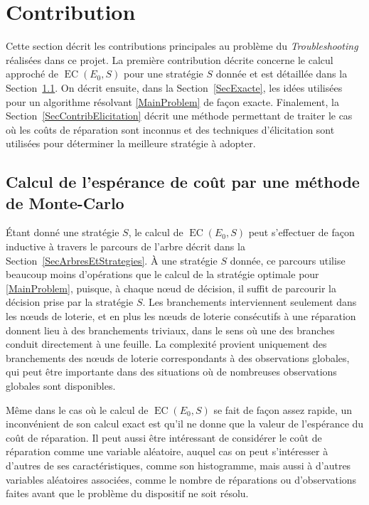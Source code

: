 \documentclass[a4paper,11pt]{article}
\theoremstyle{plain}
\theoremstyle{definition}
\DeclareMathOperator{\EC}{EC}
\begin{document}
\section{Contribution}
\label{SecContribution}

Cette section décrit les contributions principales au problème du \emph{Troubleshooting} réalisées dans ce projet. La	première contribution décrite concerne le calcul approché de $\EC(E_0, S)$ pour une stratégie $S$ donnée et est détaillée dans la Section~\ref{SecCalculMonteCarlo}. On décrit ensuite, dans la Section~\ref{SecExacte}, les idées utilisées pour un algorithme résolvant \eqref{MainProblem} de façon exacte. Finalement, la Section~\ref{SecContribElicitation} décrit une méthode permettant de traiter le cas où les coûts de réparation sont inconnus et des techniques d'élicitation sont utilisées pour déterminer la meilleure stratégie à adopter.

\subsection{Calcul de l'espérance de coût par une méthode de Monte-Carlo}
\label{SecCalculMonteCarlo}

Étant donné une stratégie $S$, le calcul de $\EC(E_0, S)$ peut s'effectuer de façon inductive à travers le parcours de l'arbre décrit dans la Section~\ref{SecArbresEtStrategies}. À une stratégie $S$ donnée, ce parcours utilise beaucoup moins d'opérations que le calcul de la stratégie optimale pour \eqref{MainProblem}, puisque, à chaque nœud de décision, il suffit de parcourir la décision prise par la stratégie $S$. Les branchements interviennent seulement dans les nœuds de loterie, et en plus les nœuds de loterie consécutifs à une réparation donnent lieu à des branchements triviaux, dans le sens où une des branches conduit directement à une feuille. La complexité provient uniquement des branchements des nœuds de loterie correspondants à des observations globales, qui peut être importante dans des situations où de nombreuses observations globales sont disponibles.

Même dans le cas où le calcul de $\EC(E_0, S)$ se fait de façon assez rapide, un inconvénient de son calcul exact est qu'il ne donne que la valeur de l'espérance du coût de réparation. Il peut aussi être intéressant de considérer le coût de réparation comme une variable aléatoire, auquel cas on peut s'intéresser à d'autres de ses caractéristiques, comme son histogramme, mais aussi à d'autres variables aléatoires associées, comme le nombre de réparations ou d'observations faites avant que le problème du dispositif ne soit résolu.
\end{document}
